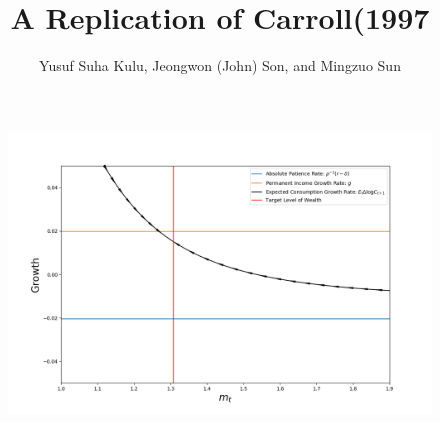 \documentclass[]{article}
\title{A Replication of Carroll(1997}
\author{Yusuf Suha Kulu, Jeongwon (John) Son, and Mingzuo Sun}
\date{}
\providecommand{\EqDir}{Equations}
\begin{document}
\linespread{2}
\maketitle




\begin{table}[H]
	\scalebox{.7}{}
	\label{table:1}
      \end{table}
\begin{figure}[H]
	\centering
	\includegraphics{Figures/Figure1a.png}
	\label{figure:1}
\end{figure}


%
\end{document}
